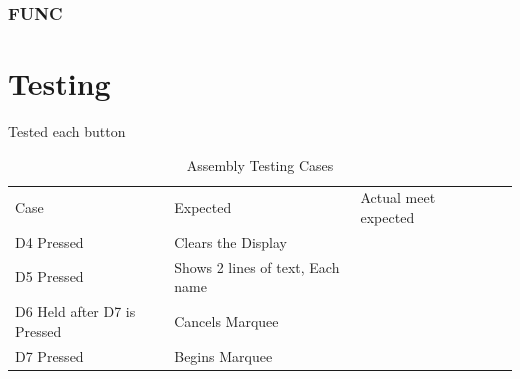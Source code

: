 \documentclass[12pt,letterpaper]{article}
\begin{document}
	\subsubsection{FUNC}

\section{Testing}
Tested each button
\begin{table}[h]
	\centering
	\begin{tabular}{|l|l|l|ll}
		\cline{1-3}
		Case & Expected & Actual meet expected &  &  \\ \cline{1-3}
	D4 Pressed	&Clears the Display&	\checkmark  &  \\ \cline{1-3}
	D5 Pressed	&Shows 2 lines of text, Each name&	\checkmark	&  \\ \cline{1-3}
	D6 Held after D7 is Pressed	&Cancels Marquee&	\checkmark  &  \\ \cline{1-3}
	D7 Pressed	&Begins Marquee&	\checkmark	&  \\ \cline{1-3}
	
	\end{tabular}
\caption{Assembly Testing Cases}
\end{table}
\end{document}
